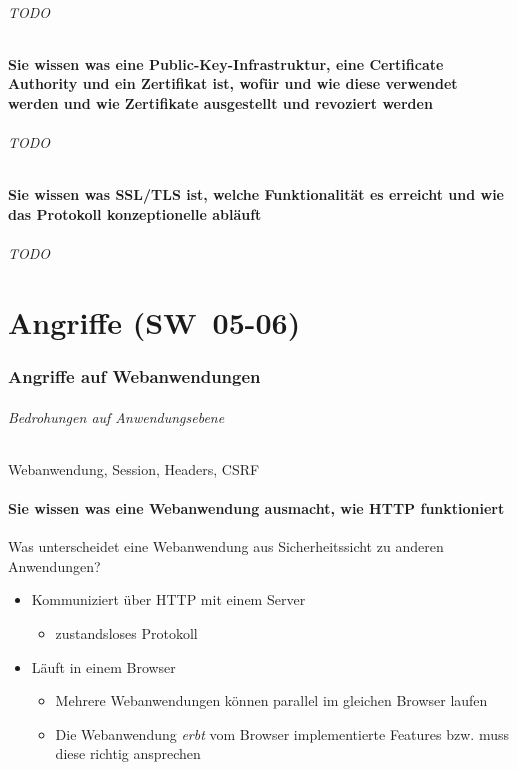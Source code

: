 \documentclass[10pt,a4paper]{article}
\begin{document}
\paragraph*{TODO}
\subsection*{Sie wissen was eine Public-Key-Infrastruktur, eine Certificate Authority und ein Zertifikat ist, wofür und wie diese verwendet werden und wie Zertifikate ausgestellt und revoziert werden}
\paragraph*{TODO}
\subsection*{Sie wissen was SSL/TLS ist, welche Funktionalität es erreicht und wie das Protokoll konzeptionelle abläuft}
\paragraph*{TODO}



\part{Angriffe (SW~05-06)}
\section{Angriffe auf Webanwendungen}
\paragraph*{Bedrohungen auf Anwendungsebene}Webanwendung, Session, Headers, CSRF
\subsection*{Sie wissen was eine Webanwendung ausmacht, wie HTTP funktioniert}
Was unterscheidet eine Webanwendung aus Sicherheitssicht zu anderen Anwendungen?
\begin{itemize}[noitemsep,topsep=0pt,leftmargin=*]
    \item Kommuniziert über HTTP mit einem Server
    \begin{itemize}[noitemsep,topsep=0pt,leftmargin=*]
        \item zustandsloses Protokoll
    \end{itemize}
    \item Läuft in einem Browser
    \begin{itemize}[noitemsep,topsep=0pt,leftmargin=*]
        \item Mehrere Webanwendungen können parallel im gleichen Browser laufen
        \item Die Webanwendung \textsl{erbt} vom Browser implementierte Features
        bzw. muss diese richtig ansprechen
    \end{itemize}
\end{itemize}
\end{document}
